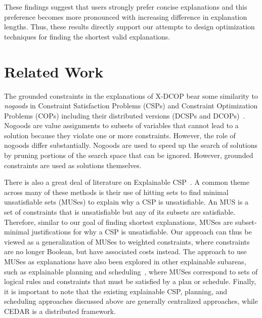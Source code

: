 \documentclass[twoside,11pt]{article}
\begin{document}
These findings suggest that users strongly prefer concise explanations and this preference becomes more pronounced with increasing difference in explanation lengths. Thus, these results directly support our attempts to design optimization techniques for finding the shortest valid explanations. 






\section{Related Work}

The grounded constraints in the explanations of X-DCOP bear some similarity to \emph{nogoods} in Constraint Satisfaction Problems (CSPs) and Constraint Optimization Problems (COPs) including their distributed versions (DCSPs and DCOPs)~\cite{schiex:94,Yokoo00,SilaghiY09}. Nogoods are value assignments to subsets of variables that cannot lead to a solution because they violate one or more constraints. However, the role of nogoods differ substantially. Nogoods are used to speed up the search of solutions by pruning portions of the search space that can be ignored. However, grounded constraints are used as solutions themselves.

There is also a great deal of literature on Explainable CSP~\cite{liffiton2008algorithms,laborie14,GuptaGO21}. A common theme across many of these methods is their use of hitting sets to find minimal unsatisfiable sets (MUSes) to explain why a CSP is unsatisfiable. An MUS is a set of constraints that is unsatisfiable but any of its subsets are satisfiable. Therefore, similar to our goal of finding shortest explanations, MUSes are subset-minimal justifications for why a CSP is unsatisfiable. Our approach can thus be viewed as a generalization of MUSes to weighted constraints, where constraints are no longer Boolean, but have associated costs instead. The approach to use MUSes as explanations have also been explored in other explainable subareas, such as explainable planning and scheduling~\cite{vas21,vasileioua2023lasp}, where MUSes correspond to sets of logical rules and constraints that must be satisfied by a plan or schedule. Finally, it is important to note that the existing explainable CSP, planning, and scheduling approaches discussed above are generally centralized approaches, while CEDAR is a distributed framework.

\end{document}
